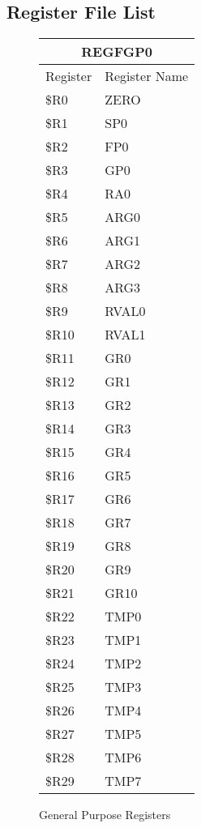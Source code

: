 \documentclass[letterpaper, 11pt]{article}
\begin{document}
\subsection{Register File List}
\begin{figure}[!h]
	\caption{General Purpose Registers}
	\parbox{0.5\linewidth}{
		\centering
		\fontsize{6}{8}\selectfont
		\begin{tabular}{|l|l|}
			\hline
			\multicolumn{2}{|c|}{REGFGP0} \\
			\hline
			Register & Register Name \\ \hline
			\$R0  & ZERO \\ 	\hline
			\$R1  & SP0 \\ 	\hline
			\$R2  & FP0 \\ 	\hline
			\$R3  & GP0 \\ 	\hline
			\$R4  & RA0 \\ 	\hline
			\$R5  & ARG0 \\ 	\hline
			\$R6  & ARG1 \\ 	\hline
			\$R7  & ARG2 \\ 	\hline
			\$R8  & ARG3 \\ 	\hline
			\$R9  & RVAL0 \\ 	\hline
			\$R10 & RVAL1 \\ \hline
			\$R11 & GR0  \\ \hline
			\$R12 & GR1  \\ \hline
			\$R13 & GR2  \\ \hline
			\$R14 & GR3  \\ \hline
			\$R15 & GR4  \\ \hline
			\$R16 & GR5  \\ \hline
			\$R17 & GR6  \\ \hline
			\$R18 & GR7  \\ \hline
			\$R19 & GR8  \\ \hline
			\$R20 & GR9  \\ \hline
			\$R21 & GR10  \\ \hline
			\$R22 & TMP0  \\ \hline
			\$R23 & TMP1 \\ \hline
			\$R24 & TMP2  \\ \hline
			\$R25 & TMP3  \\ \hline
			\$R26 & TMP4  \\ \hline
			\$R27 & TMP5  \\ \hline
			\$R28 & TMP6  \\ \hline
			\$R29 & TMP7  \\ \hline

\end{tabular}}
\end{figure}
\end{document}

